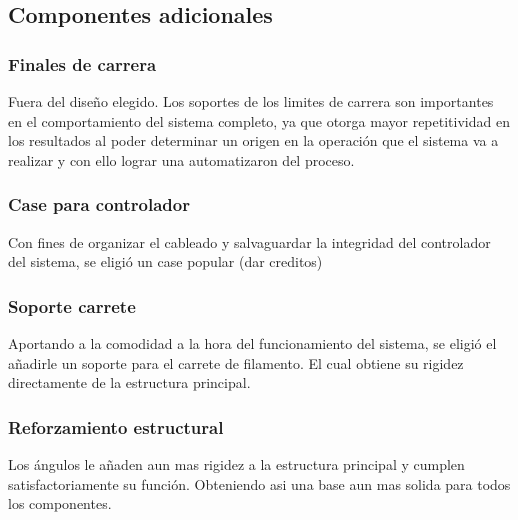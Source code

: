 \subsection{Componentes adicionales}
\subsubsection{Finales de carrera}
Fuera del diseño elegido. Los soportes de los limites de carrera son importantes en el comportamiento del sistema completo, ya que otorga mayor repetitividad en los resultados al poder determinar un origen en la operación que el sistema va a realizar y con ello lograr una automatizaron del proceso.
\subsubsection{Case para controlador}
Con fines de organizar el cableado y  salvaguardar la integridad del controlador del sistema, se eligió un case  popular (dar creditos)

\subsubsection{Soporte carrete}
Aportando a la  comodidad a la hora del funcionamiento del sistema, se eligió el añadirle un soporte para el carrete de filamento. El cual obtiene su rigidez  directamente de la estructura principal.

\subsubsection{Reforzamiento estructural}
Los ángulos  le añaden aun mas rigidez a la estructura principal y cumplen satisfactoriamente su función. Obteniendo asi una base aun mas solida para todos los componentes.

